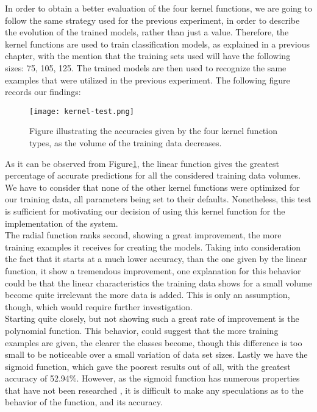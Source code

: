\documentclass[11pt]{report}
\begin{document}
In order to obtain a better evaluation of the four kernel functions, we are going to follow the same strategy used for the previous experiment, in order to describe the evolution of the trained models, rather than just a value. Therefore, the kernel functions are used to train classification models, as explained in a previous chapter, with the mention that the training sets used will have the following sizes: 75, 105, 125. The trained models are then used to recognize the same examples that were utilized in the previous experiment. The following figure records our findings:

\begin{figure}
    \centering
    \texttt{[image: kernel-test.png]}
    \caption{Figure illustrating the accuracies given by the four kernel function types, as the volume of the training data decreases.}
    \label{fig:kernel-test}
\end{figure}

As it can be observed from Figure\ref{fig:kernel-test}, the linear function gives the greatest percentage of accurate predictions for all the considered training data volumes. We have to consider that none of the other kernel functions were optimized for our training data, all parameters being set to their defaults. Nonetheless, this test is sufficient for motivating our decision of using this kernel function for the implementation of the system. \\
The radial function ranks second, showing a great improvement, the more training examples it receives for creating the models. Taking into consideration the fact that it starts at a much lower accuracy, than the one given by the linear function, it show a tremendous improvement, one explanation for this behavior could be that the linear characteristics the training data shows for a small volume become quite irrelevant the more data is added. This is only an assumption, though, which would require further investigation. \\
Starting quite closely, but not showing such a great rate of improvement is the polynomial function. This behavior, could suggest that the more training examples are given, the clearer the classes become, though this difference is too small to be noticeable over a small variation of data set sizes. Lastly we have the sigmoid function, which gave the poorest results out of all, with the greatest accuracy of 52.94\%. However, as the sigmoid function has numerous properties that have not been researched \cite{gamma}, it is difficult to make any speculations as to the behavior of the function, and its accuracy.\\
\end{document}
